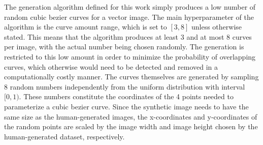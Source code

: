 The generation algorithm defined for this work simply produces a low number of random cubic bezier curves for a vector image. The main hyperparameter of the algorithm is the curve amount range, which is set to $[3,8]$ unless otherwise stated. This means that the algorithm produces at least 3 and at most 8 curves per image, with the actual number being chosen randomly. The generation is restricted to this low amount in order to minimize the probability of overlapping curves, which otherwise would need to be detected and removed in a computationally costly manner. The curves themselves are generated by sampling 8 random numbers independently from the uniform distribution with interval $[0,1)$. These numbers constitute the coordinates of the 4 points needed to parameterize a cubic bezier curve. Since the synthetic image needs to have the same size as the human-generated images, the x-coordinates and y-coordinates of the random points are scaled by the image width and image height chosen by the human-generated dataset, respectively.

